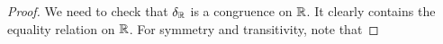 \begin{appendices}
\begin{proof}
We need to check that $\delta_{\mathbb{R}}$ is a congruence on $\mathbb{R}$. It clearly contains the equality relation on $\mathbb{R}$. For symmetry and transitivity, note that

\end{proof}
\end{appendices}
